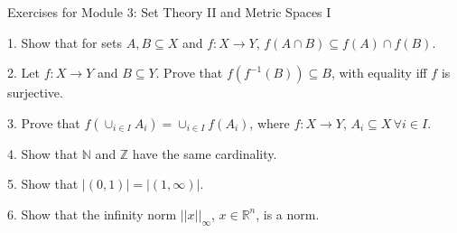 \documentclass{article}
\theoremstyle{remark} %
\newcommand{\R}{{\mathbb{R}}}
\newcommand{\Z}{{\mathbb{Z}}}
\newcommand{\N}{{\mathbb{N}}}
\begin{document}
\begin{center}
\Large{Exercises for Module 3: Set Theory II and Metric Spaces I}
\end{center}

1. Show that for sets $A,B \subseteq X$ and $f: X \to Y$, $f(A \cap B) \subseteq f(A) \cap f(B)$.

\vspace{11cm} %



2. Let $f: X \to Y$ and $B \subseteq Y$. Prove that $f(f^{-1}(B)) \subseteq B$, with equality iff $f$ is surjective.

\vspace{13cm} %




3. Prove that $f(\cup_{i \in I}A_i) = \cup_{i \in I}f(A_i)$, where $f:X \to Y$, $A_i \subseteq X \, \forall i \in I$. 

\vspace{11cm} %




4. Show that $\N$ and $\Z$ have the same cardinality. 

\vspace{11cm} %




5. Show that $|(0,1)| =|(1,\infty)|$.

\vspace{11cm} %





6. Show that the infinity norm $||x||_\infty$, $x \in \R^n$, is a norm.

    
\vspace{11cm} %
\end{document}
